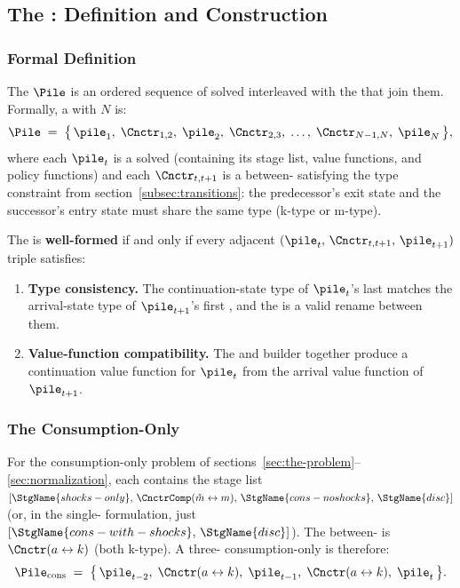 \subsection{The {\PileName}: Definition and Construction}\label{subsec:building-pile}

\subsubsection{Formal Definition}

The {\pileName} $\Pile$ is an ordered sequence of solved {\intervals}
interleaved with the {\Cncts} that join them. Formally, a {\pileName}
with $N$ {\intervals} is:
\begin{equation}
  \Pile
  \;=\;
  \bigl\{\,
    \pile_1,\;
    \Cnctr_{1,2},\;
    \pile_2,\;
    \Cnctr_{2,3},\;
    \ldots,\;
    \Cnctr_{N-1,N},\;
    \pile_N
  \,\bigr\},
  \label{eq:pile-def}
\end{equation}
where each $\pile_{\prdt}$ is a solved {\interval} (containing its stage
list, value functions, and policy functions) and each $\Cnctr_{\prdt,\prdt+1}$
is a between-{\interval} {\Cnct} satisfying the type constraint from
section~\ref{subsec:transitions}: the predecessor's exit state and the
successor's entry state must share the same type (k-type or m-type).

The {\pileName} is \textbf{well-formed} if and only if every adjacent
$(\pile_{\prdt},\, \Cnctr_{\prdt,\prdt+1},\, \pile_{\prdt+1})$ triple
satisfies:
\begin{enumerate}
  \item \textbf{Type consistency.} The continuation-state type of
    $\pile_{\prdt}$'s last {\stg} matches the arrival-state type of
    $\pile_{\prdt+1}$'s first {\stg}, and the {\Cnct} is a valid rename
    between them.
  \item \textbf{Value-function compatibility.} The {\Cnct} and builder
    together produce a continuation value function for $\pile_{\prdt}$
    from the arrival value function of $\pile_{\prdt+1}$.
\end{enumerate}

\subsubsection{The Consumption-Only {\PileName}}

For the consumption-only problem of
sections~\ref{sec:the-problem}--\ref{sec:normalization}, each {\interval}
contains the stage list
$[\StgName{shocks-only},\, \CnctrComp(\check{\mNrm} \leftrightarrow \mNrm),\,
  \StgName{cons-noshocks},\, \StgName{disc}]$
(or, in the single-{\stg} formulation, just
$[\StgName{cons-with-shocks},\, \StgName{disc}]$).
The between-{\interval} {\Cnct} is
$\Cnctr(\aNrm \leftrightarrow \kNrm)$ (both k-type).
A three-{\interval} consumption-only {\pileName} is therefore:
\begin{equation*}
  \Pile_{\text{cons}}
  \;=\;
  \bigl\{\,
    \pile_{\prdT-2},\;
    \Cnctr(\aNrm \leftrightarrow \kNrm),\;
    \pile_{\prdT-1},\;
    \Cnctr(\aNrm \leftrightarrow \kNrm),\;
    \pile_{\prdT}
  \,\bigr\}.
\end{equation*}

